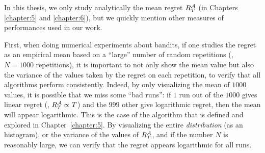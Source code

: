 In this thesis, we only study analytically the mean regret $R_T^{\mathcal{A}}$ (in Chapters \ref{chapter:5} and \ref{chapter:6}), but we quickly mention other measures of performances used in our work.

First, when doing numerical experiments about bandits, if one studies the regret as an empirical mean based on a ``large'' number of random repetitions (\eg, $N=1000$ repetitions), it is important to not only show the mean value but also the variance of the values taken by the regret on each repetition, to verify that all algorithms perform consistently.
Indeed, by only visualizing the mean of $1000$ values, it is possible that we miss some ``bad runs'': if $1$ run out of the $1000$ gives linear regret (\ie, $R_T^{\mathcal{A}} \propto T$) and the $999$ other give logarithmic regret, then the mean will appear logarithmic.
This is the case of the \Selfish{} algorithm that is defined and explored in Chapter~\ref{chapter:5}.
By visualizing the entire \emph{distribution} (as an histogram), or the variance of the values of $R_T^{\mathcal{A}}$, and if the number $N$ is reasonably large, we can verify that the regret appears logarithmic for all runs.


